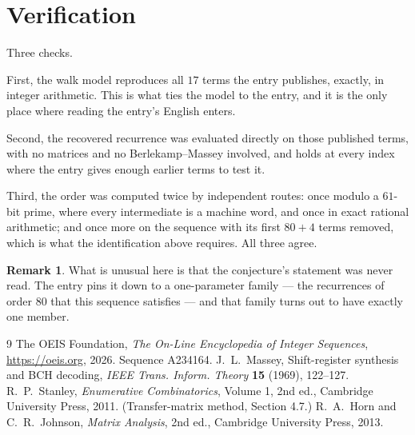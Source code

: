 \documentclass[11pt,a4paper]{article}
\theoremstyle{plain}
\theoremstyle{definition}
\newtheorem{remark}[theorem]{Remark}
\begin{document}
\section{Verification}

Three checks.

First, the walk model reproduces all $17$ terms the entry publishes, exactly, in integer
arithmetic. This is what ties the model to the entry, and it is the only place where reading
the entry's English enters.

Second, the recovered recurrence was evaluated directly on those published terms, with no
matrices and no Berlekamp--Massey involved, and holds at every index where the entry gives
enough earlier terms to test it.

Third, the order was computed twice by independent routes: once modulo a $61$-bit prime, where
every intermediate is a machine word, and once in exact rational arithmetic; and once more on
the sequence with its first $80+4$ terms removed, which is what the identification above
requires. All three agree.

\begin{remark}
What is unusual here is that the conjecture's statement was never read. The entry pins it down
to a one-parameter family --- the recurrences of order $80$ that this sequence satisfies
--- and that family turns out to have exactly one member.
\end{remark}

\begin{thebibliography}{9}
 The OEIS Foundation, \emph{The On-Line Encyclopedia of Integer
Sequences}, \url{https://oeis.org}, 2026. Sequence A234164.
 J.~L.~Massey, Shift-register synthesis and BCH decoding, \emph{IEEE
Trans. Inform. Theory} \textbf{15} (1969), 122--127.
 R.~P.~Stanley, \emph{Enumerative Combinatorics}, Volume 1, 2nd ed.,
Cambridge University Press, 2011. (Transfer-matrix method, Section 4.7.)
 R.~A.~Horn and C.~R.~Johnson, \emph{Matrix Analysis}, 2nd ed., Cambridge
University Press, 2013.
\end{thebibliography}
\end{document}
